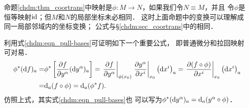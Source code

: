 命题\ref{chdm:thm_coortrans}中映射是$\phi:M\to N$，如果我们令$N\equiv M$，并且
令$\phi$是恒等映射${\rm id}$；但$M$和$N$的局部坐标未必相同．
这时上面命题中的变换可以理解成同一局部邻域内的{\kaishu 坐标变换}；
公式与\S\ref{chdm:sec_coortrans}中的相同．

利用式\eqref{chdm:eqn_pull-bases}可证明如下一个重要公式，
即普通微分和拉回映射可对易．
\begin{align}
    {\phi ^*} ({\rm d} f)_a =& {\phi ^*} \left[ \frac{ \partial f  } 
      {\partial y^\alpha} ({\rm d} y^\alpha)_a  \right]
    = \left. \frac{ \partial f }{\partial y^\alpha} \right|_{\phi(x_0)}
      \left. \frac{{\partial {y^\alpha }}}{{\partial {x^i}}} \right|_{x_0}
      \left( {{\rm{d}}{x^i }} \right)_a 
    = \left. \frac{ \partial (f \circ \phi) }{\partial x^i} \right|_{x_0}
      \left( {{\rm{d}}{x^i }} \right)_a  \notag\\
    =& {\rm d}_a (f \circ \phi) ={\rm d}_a ({\phi ^*}f) . \label{chdm:eqn_dfphi}
\end{align}
仿照上式，其实式\eqref{chdm:eqn_pull-bases}也
可以写为${\phi ^*} ({\rm d} y^\alpha)_a = {\rm d}_a (y^\alpha \circ \phi)$．

